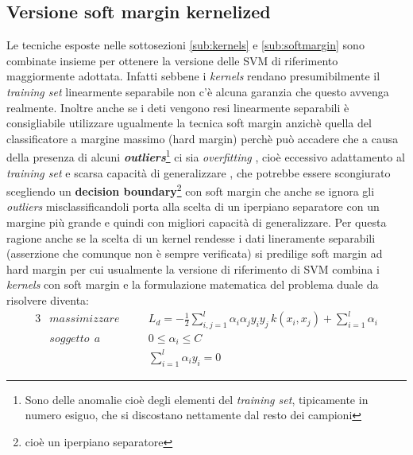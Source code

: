 \subsection{Versione soft margin kernelized}
Le tecniche esposte nelle sottosezioni \ref{sub:kernels} e \ref{sub:softmargin} sono combinate insieme per ottenere la versione delle \ac{SVM} di riferimento maggiormente adottata. Infatti sebbene i  \textit{kernels} rendano presumibilmente il \textit{training set} linearmente separabile non c'è alcuna garanzia che questo avvenga realmente. Inoltre anche se i deti vengono resi linearmente separabili è consigliabile utilizzare ugualmente la tecnica soft margin anzichè quella del classificatore a margine massimo (hard margin) perchè può accadere che a causa della presenza di alcuni \textbf{\textit{outliers}}\footnote{Sono delle anomalie cioè degli elementi del \textit{training set}, tipicamente in numero esiguo, che si discostano nettamente dal resto dei campioni} ci sia \textit{overfitting} , cioè eccessivo adattamento al \textit{training set} e scarsa capacità di generalizzare , che potrebbe essere scongiurato scegliendo un \textbf{decision boundary}\footnote{cioè un iperpiano separatore} con soft margin che anche se ignora gli \textit{outliers} misclassificandoli porta alla scelta di un iperpiano separatore con un margine più grande e quindi con migliori capacità di generalizzare. Per questa ragione anche se la scelta di un kernel rendesse i dati lineramente separabili (asserzione che comunque non è sempre verificata) si predilige soft margin ad hard margin per cui usualmente la versione di riferimento di \ac{SVM} combina i \textit{kernels} con soft margin e la formulazione matematica del problema duale da risolvere diventa:
\begin{alignat}{3}
\label{eq:softford}
&massimizzare \quad&&L_{d} = - \frac{1}{2} \sum_{i,j = 1}^{l}\alpha_{i}\alpha_{j}y_{i}y_{j}\,k(x_{i} , x_{j}) + \sum_{i=1}^{l}\alpha_{i} \\
\label{eq:softvincd}
&soggetto \:\:a &&0 \leq \alpha_i \leq C \qquad \qquad \\
\label{eq:softvind2}
&\:&&\sum_{i=1}^{l} \alpha_i y_i = 0 
\end{alignat}

